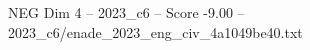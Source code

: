 \begin{textsample}{NEG Dim 4 – 2023\_c6 – Score -9.00 – 2023\_c6/enade\_2023\_eng\_civ\_4a1049be40.txt}
\end{textsample}

